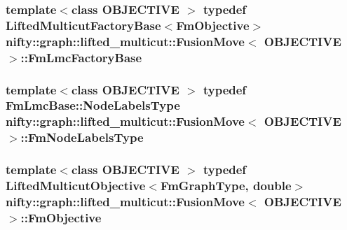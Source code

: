 \subsubsection[{Fm\+Lmc\+Factory\+Base}]{\setlength{\rightskip}{0pt plus 5cm}template$<$class O\+B\+J\+E\+C\+T\+I\+V\+E $>$ typedef {\bf Lifted\+Multicut\+Factory\+Base}$<${\bf Fm\+Objective}$>$ {\bf nifty\+::graph\+::lifted\+\_\+multicut\+::\+Fusion\+Move}$<$ O\+B\+J\+E\+C\+T\+I\+V\+E $>$\+::{\bf Fm\+Lmc\+Factory\+Base}}\label{classnifty_1_1graph_1_1lifted__multicut_1_1FusionMove_ac2b4a0ecbc324dd7b5b4a7805c714aae}
\hypertarget{classnifty_1_1graph_1_1lifted__multicut_1_1FusionMove_ae035e44c19bb9d5682ad108a4933d3d4}{}
\subsubsection[{Fm\+Node\+Labels\+Type}]{\setlength{\rightskip}{0pt plus 5cm}template$<$class O\+B\+J\+E\+C\+T\+I\+V\+E $>$ typedef {\bf Fm\+Lmc\+Base\+::\+Node\+Labels\+Type} {\bf nifty\+::graph\+::lifted\+\_\+multicut\+::\+Fusion\+Move}$<$ O\+B\+J\+E\+C\+T\+I\+V\+E $>$\+::{\bf Fm\+Node\+Labels\+Type}}\label{classnifty_1_1graph_1_1lifted__multicut_1_1FusionMove_ae035e44c19bb9d5682ad108a4933d3d4}
\hypertarget{classnifty_1_1graph_1_1lifted__multicut_1_1FusionMove_a41ae4e1f1fa44e3a67e5a62dc3098083}{}
\subsubsection[{Fm\+Objective}]{\setlength{\rightskip}{0pt plus 5cm}template$<$class O\+B\+J\+E\+C\+T\+I\+V\+E $>$ typedef {\bf Lifted\+Multicut\+Objective}$<${\bf Fm\+Graph\+Type}, double$>$ {\bf nifty\+::graph\+::lifted\+\_\+multicut\+::\+Fusion\+Move}$<$ O\+B\+J\+E\+C\+T\+I\+V\+E $>$\+::{\bf Fm\+Objective}}\label{classnifty_1_1graph_1_1lifted__multicut_1_1FusionMove_a41ae4e1f1fa44e3a67e5a62dc3098083}
\hypertarget{classnifty_1_1graph_1_1lifted__multicut_1_1FusionMove_afe918cca306f3d00480c7908da070281}{}
